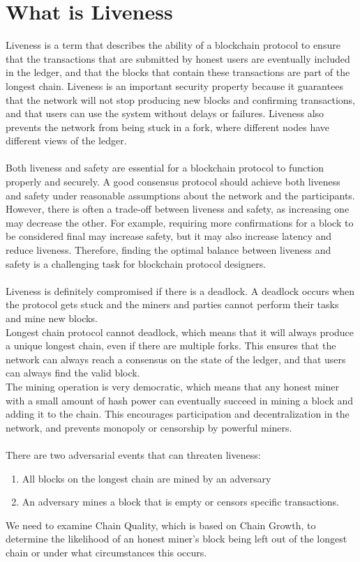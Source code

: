 \section{What is Liveness}
Liveness is a term that describes the ability of a blockchain protocol to ensure that the transactions that are submitted by honest users are eventually included in the ledger, and that the blocks that contain these transactions are part of the longest chain. Liveness is an important security property because it guarantees that the network will not stop producing new blocks and confirming transactions, and that users can use the system without delays or failures. Liveness also prevents the network from being stuck in a fork, where different nodes have different views of the ledger.\\\\
Both liveness and safety are essential for a blockchain protocol to function properly and securely. A good consensus protocol should achieve both liveness and safety under reasonable assumptions about the network and the participants. However, there is often a trade-off between liveness and safety, as increasing one may decrease the other. For example, requiring more confirmations for a block to be considered final may increase safety, but it may also increase latency and reduce liveness. Therefore, finding the optimal balance between liveness and safety is a challenging task for blockchain protocol designers.\\\\
Liveness is definitely compromised if there is a deadlock. A deadlock occurs when the protocol gets stuck and the miners and parties cannot perform their tasks and mine new blocks.\\
Longest chain protocol cannot deadlock, which means that it will always produce a unique longest chain, even if there are multiple forks. This ensures that the network can always reach a consensus on the state of the ledger, and that users can always find the valid block.\\
The mining operation is very democratic, which means that any honest miner with a small amount of hash power can eventually succeed in mining a block and adding it to the chain. This encourages participation and decentralization in the network, and prevents monopoly or censorship by powerful miners.\\\\
There are two adversarial events that can threaten liveness:
\begin{enumerate}
	\item All blocks on the longest chain are mined by an adversary
	\item An adversary mines a block that is empty or censors specific transactions.
\end{enumerate} 
We need to examine Chain Quality, which is based on Chain Growth, to determine the likelihood of an honest miner’s block being left out of the longest chain or under what circumstances this occurs.

